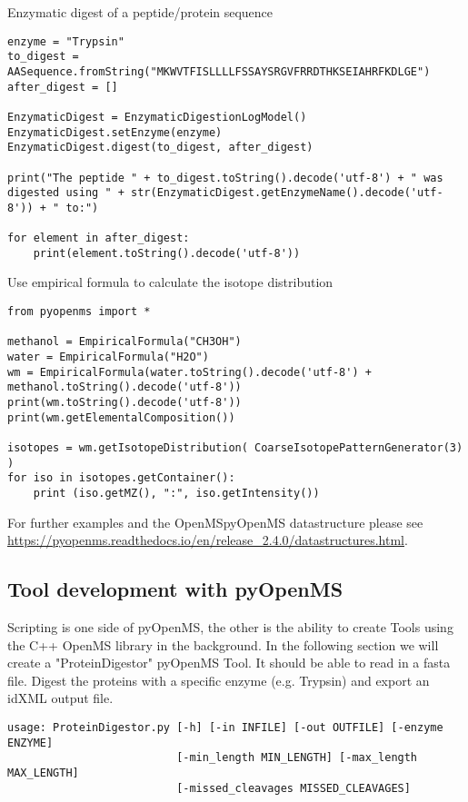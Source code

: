 {\noindent Enzymatic digest of a peptide/protein sequence 
\begin{lstlisting}
enzyme = "Trypsin"
to_digest = AASequence.fromString("MKWVTFISLLLLFSSAYSRGVFRRDTHKSEIAHRFKDLGE")
after_digest = []

EnzymaticDigest = EnzymaticDigestionLogModel()
EnzymaticDigest.setEnzyme(enzyme)
EnzymaticDigest.digest(to_digest, after_digest)

print("The peptide " + to_digest.toString().decode('utf-8') + " was digested using " + str(EnzymaticDigest.getEnzymeName().decode('utf-8')) + " to:")

for element in after_digest:
    print(element.toString().decode('utf-8'))
\end{lstlisting}

\noindent Use empirical formula to calculate the isotope distribution 
\begin{lstlisting}
from pyopenms import *

methanol = EmpiricalFormula("CH3OH")
water = EmpiricalFormula("H2O")
wm = EmpiricalFormula(water.toString().decode('utf-8') + methanol.toString().decode('utf-8'))
print(wm.toString().decode('utf-8'))
print(wm.getElementalComposition())

isotopes = wm.getIsotopeDistribution( CoarseIsotopePatternGenerator(3) )
for iso in isotopes.getContainer():
    print (iso.getMZ(), ":", iso.getIntensity())
\end{lstlisting}

\noindent For further examples and the OpenMS\/pyOpenMS datastructure please see \url{https://pyopenms.readthedocs.io/en/release_2.4.0/datastructures.html}. 

\subsection{Tool development with pyOpenMS}
Scripting is one side of pyOpenMS, the other is the ability to create Tools using the C++ OpenMS library in the background.  In the following section we will create a "ProteinDigestor" pyOpenMS Tool. It should be able to read in a fasta file. Digest the proteins with a specific enzyme (e.g. Trypsin) and export an idXML output file.

\begin{lstlisting}
usage: ProteinDigestor.py [-h] [-in INFILE] [-out OUTFILE] [-enzyme ENZYME]
                          [-min_length MIN_LENGTH] [-max_length MAX_LENGTH]
                          [-missed_cleavages MISSED_CLEAVAGES]


\end{lstlisting}}
